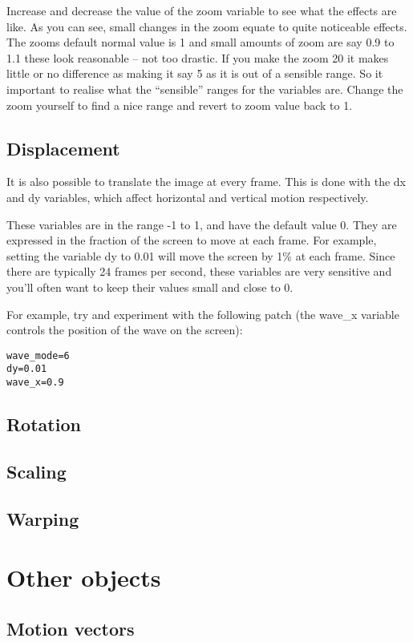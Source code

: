\documentclass[11pt, a5paper, pagesize]{scrbook}
\begin{document}
Increase and decrease the value of the zoom variable to see what the effects are like. As you can see, small changes in the zoom equate to quite noticeable effects. The zooms default normal value is 1 and small amounts of zoom are say 0.9 to 1.1 these look reasonable -- not too drastic. If you make the zoom 20 it makes little or no difference as making it say 5 as it is out of a sensible range. So it important to realise what the ``sensible'' ranges for the variables are. Change the zoom yourself to find a nice range and revert to zoom value back to 1.

\subsection{Displacement}
It is also possible to translate the image at every frame. This is done with the dx and dy variables, which affect horizontal and vertical motion respectively.

These variables are in the range -1 to 1, and have the default value 0. They are expressed in the fraction of the screen to move at each frame. For example, setting the variable dy to 0.01 will move the screen by 1\% at each frame. Since there are typically 24 frames per second, these variables are very sensitive and you'll often want to keep their values small and close to 0.

For example, try and experiment with the following patch (the wave\_x variable controls the position of the wave on the screen):
\begin{verbatim}
wave_mode=6
dy=0.01
wave_x=0.9
\end{verbatim}

\subsection{Rotation}

\subsection{Scaling}

\subsection{Warping}

\section{Other objects}
\subsection{Motion vectors}
\end{document}
